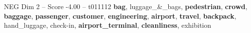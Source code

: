 \begin{textsample}{NEG Dim 2 – Score -4.00 – t011112}  \label{ex:f2_neg_014}
\textbf{bag}, luggage\_\&\_bags, \textbf{pedestrian}, \textbf{crowd}, \textbf{baggage}, \textbf{passenger}, \textbf{customer}, \textbf{engineering}, \textbf{airport}, \textbf{travel}, \textbf{backpack}, hand\_luggage, check-in, \textbf{airport\_terminal}, \textbf{cleanliness}, exhibition

\end{textsample}
